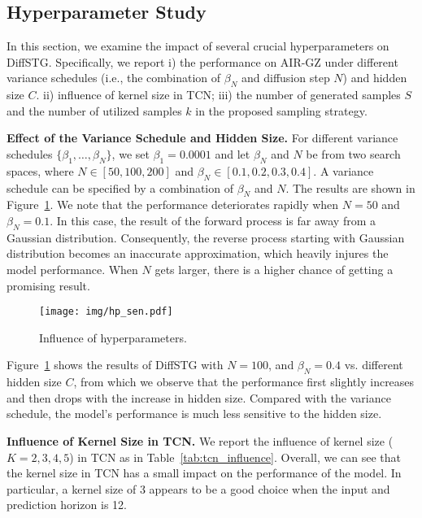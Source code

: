 {\subsection{Hyperparameter Study} \label{sec:hyperparameter_study}
\par In this section, we examine the impact of several crucial hyperparameters on DiffSTG. Specifically, we report i) the performance on AIR-GZ under different variance schedules (i.e., the combination of $\beta_N$ and diffusion step $N$) and hidden size $C$. ii) influence of kernel size in TCN; iii)  the number of generated samples $S$ and the number of utilized samples $k$ in the proposed  sampling strategy.

\par \textbf{Effect of the Variance Schedule and Hidden Size.} For different variance schedules $\{\beta_1, \dots, \beta_N\}$, we set $\beta_1 = 0.0001$ and let $\beta_N$ and $N$ be from two search spaces, where $N \in [50, 100, 200]$ and $\beta_N \in [0.1, 0.2, 0.3, 0.4]$. A variance schedule can be specified by a combination of $\beta_N$ and $N$. The results are shown in Figure~\ref{fig:hp_sen}. We note that the performance deteriorates rapidly when $N=50$ and $\beta_N=0.1$. In this case, the result of the forward process is far away from a Gaussian distribution. Consequently, the reverse process starting with Gaussian distribution becomes an inaccurate approximation, which heavily injures the model performance. When $N$ gets larger, there is a higher chance of getting a promising result.

\begin{figure}[htbp]
    \centering
    \texttt{[image: img/hp\_sen.pdf]} 
    \vspace{-2em}
    \caption{Influence of hyperparameters.}
    \label{fig:hp_sen}
\end{figure}

\par Figure~\ref{fig:hp_sen} shows the results of DiffSTG with $N=100$, and $\beta_N=0.4$ vs. different hidden size $C$, from which we observe that the performance first slightly increases and then drops with the increase in hidden size. Compared with the variance schedule, the model's performance is much less sensitive to the hidden size. 

\par \textbf{Influence of Kernel Size in TCN.} We report the influence of kernel size ($K =2,3,4,5$) in TCN as in Table~\ref{tab:tcn_influence}. Overall, we can see that the kernel size in TCN has a small impact on the performance of the model. In particular, a kernel size of 3 appears to be a good choice when the input and prediction horizon is 12.

}
